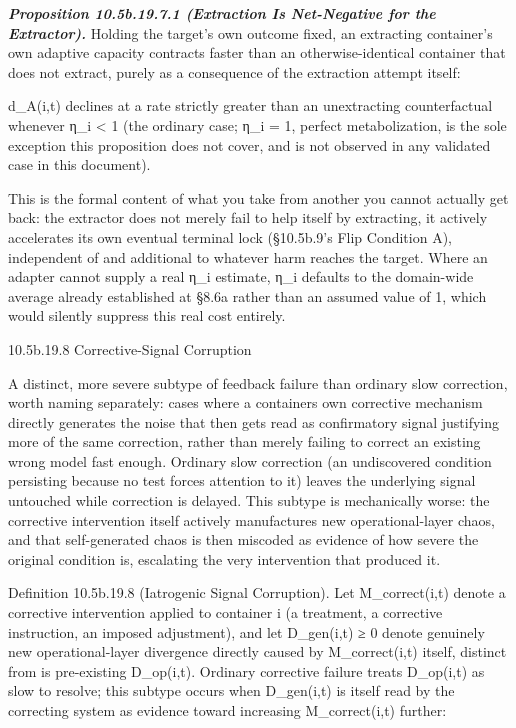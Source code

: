 \documentclass[
]{article}
\begin{document}
\emph{\textbf{Proposition 10.5b.19.7.1 (Extraction Is Net-Negative for
the Extractor).}} Holding the target's own outcome fixed, an extracting
container's own adaptive capacity contracts faster than an
otherwise-identical container that does not extract, purely as a
consequence of the extraction attempt itself:

d\_A(i,t) declines at a rate strictly greater than an unextracting
counterfactual whenever η\_i \textless{} 1 (the ordinary case; η\_i = 1,
perfect metabolization, is the sole exception this proposition does not
cover, and is not observed in any validated case in this document).

This is the formal content of what you take from another you cannot
actually get back: the extractor does not merely fail to help itself by
extracting, it actively accelerates its own eventual terminal lock
(§10.5b.9's Flip Condition A), independent of and additional to whatever
harm reaches the target. Where an adapter cannot supply a real η\_i
estimate, η\_i defaults to the domain-wide average already established
at §8.6a rather than an assumed value of 1, which would silently
suppress this real cost entirely.

10.5b.19.8 Corrective-Signal Corruption

A distinct, more severe subtype of feedback failure than ordinary slow
correction, worth naming separately: cases where a containers own
corrective mechanism directly generates the noise that then gets read as
confirmatory signal justifying more of the same correction, rather than
merely failing to correct an existing wrong model fast enough. Ordinary
slow correction (an undiscovered condition persisting because no test
forces attention to it) leaves the underlying signal untouched while
correction is delayed. This subtype is mechanically worse: the
corrective intervention itself actively manufactures new
operational-layer chaos, and that self-generated chaos is then miscoded
as evidence of how severe the original condition is, escalating the very
intervention that produced it.

Definition 10.5b.19.8 (Iatrogenic Signal Corruption). Let
M\_correct(i,t) denote a corrective intervention applied to container i
(a treatment, a corrective instruction, an imposed adjustment), and let
D\_gen(i,t) ≥ 0 denote genuinely new operational-layer divergence
directly caused by M\_correct(i,t) itself, distinct from is pre-existing
D\_op(i,t). Ordinary corrective failure treats D\_op(i,t) as slow to
resolve; this subtype occurs when D\_gen(i,t) is itself read by the
correcting system as evidence toward increasing M\_correct(i,t) further:
\end{document}

